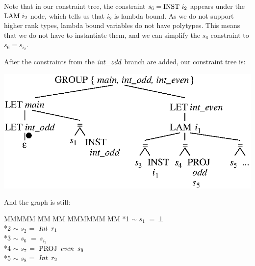 Note that in our constraint tree, the constraint $s_6 = \textrm{INST} \ i_2$ appears under the $\textrm{LAM} \ i_2$ node, which tells us that $i_2$ is lambda bound. As we do not support higher rank types, lambda bound variables do not have polytypes. This means that we do not have to instantiate them, and we can simplify the $s_6$ constraint to $s_6 = s_{i_2}$. 

\clearpage{}
After the constraints from the $\operatorname{\mathit{int\_odd}}$ branch are added, our constraint tree is:
\begin{center}
\includegraphics{3-Inference/fig/ordering/tree-intodd-gen}
\end{center}
\vspace{-2em}
And the graph is still:
\begin{tabbing}
MMMMM	\= MM 	\= MM 		\= MMMMMM 	\= MM \kill
	\> *1	\> $\sim$	\> $s_1$	\> $= \ \bot$ \\
	\> *2	\> $\sim$	\> $s_2$	\> $= \ \operatorname{\mathit{Int}}  \ r_1$ \\
	\> *3	\> $\sim$	\> $s_6$	\> $= \ s_{i_2}$ \\
	\> *4	\> $\sim$	\> $s_7$	\> $= \ \textrm{PROJ} \ \operatorname{\mathit{even}} \ s_8$ \\
	\> *5	\> $\sim$	\> $s_8$	\> $= \ \operatorname{\mathit{Int}} \ r_2$
\end{tabbing}

